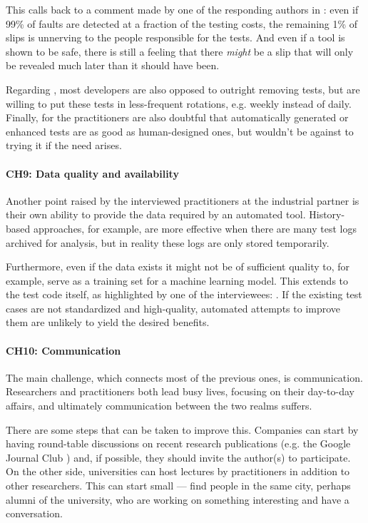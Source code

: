 This calls back to a comment made by one of the responding authors in : even if 99\% of faults are detected at a fraction of the testing costs, the remaining 1\% of slips is unnerving to the people responsible for the tests.
And even if a tool is shown to be safe, there is still a feeling that there \textit{might} be a slip that will only be revealed much later than it should have been.

Regarding \tsr, most developers are also opposed to outright removing tests, but are willing to put these tests in less-frequent rotations, e.g. weekly instead of daily.
Finally, for \tsa the practitioners are also doubtful that automatically generated or enhanced tests are as good as human-designed ones, but wouldn't be against to trying it if the need arises.

\paragraph{CH9: Data quality and availability}
Another point raised by the interviewed practitioners at the industrial partner is their own ability to provide the data required by an automated tool.
History-based approaches, for example, are more effective when there are many test logs archived for analysis, but in reality these logs are only stored temporarily.

Furthermore, even if the data exists it might not be of sufficient quality to, for example, serve as a training set for a machine learning model.
This extends to the test code itself, as highlighted by one of the interviewees:
.
If the existing test cases are not standardized and high-quality, automated attempts to improve them are unlikely to yield the desired benefits.

\paragraph{CH10: Communication}
The main challenge, which connects most of the previous ones, is communication.
Researchers and practitioners both lead busy lives, focusing on their day-to-day affairs, and ultimately communication between the two realms suffers.

There are some steps that can be taken to improve this.
Companies can start by having round-table discussions on recent research publications (e.g. the Google Journal Club \cite{googlejournal}) and, if possible, they should invite the author(s) to participate.
On the other side, universities can host lectures by practitioners in addition to other researchers.
This can start small --- find people in the same city, perhaps alumni of the university, who are working on something interesting and have a conversation.

